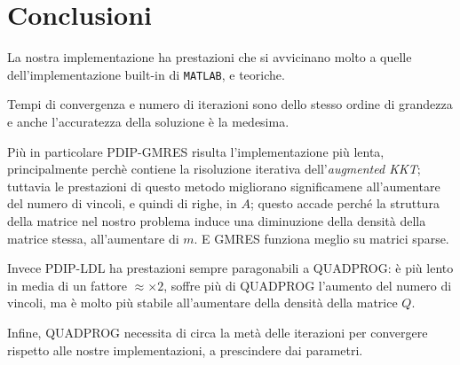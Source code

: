 \section{Conclusioni}
La nostra implementazione ha prestazioni che si avvicinano molto a quelle dell'implementazione built-in di \texttt{MATLAB}, e teoriche.

Tempi di convergenza e numero di iterazioni sono dello stesso ordine di grandezza e anche l'accuratezza della soluzione è la medesima.

Più in particolare PDIP-GMRES risulta l'implementazione più lenta, principalmente perchè contiene la risoluzione iterativa dell'\textit{augmented KKT}; tuttavia le prestazioni di questo metodo migliorano significamene all'aumentare del numero di vincoli, e quindi di righe, in $A$; questo accade perché la struttura della matrice nel nostro problema induce una diminuzione della densità della matrice stessa, all'aumentare di $m$. E GMRES funziona meglio su matrici sparse.
    
Invece PDIP-LDL ha prestazioni sempre paragonabili a QUADPROG: è più lento in media di un fattore $\approx\times2$, soffre più di QUADPROG l'aumento del numero di vincoli, ma è molto più stabile all'aumentare della densità della matrice $Q$.
    
Infine, QUADPROG necessita di circa la metà delle iterazioni per convergere rispetto alle nostre implementazioni, a prescindere dai parametri.
